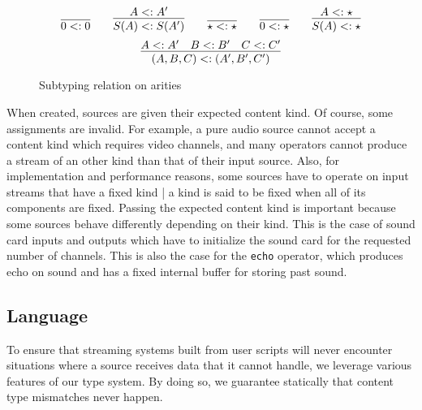 \begin{figure}[htpb]
\[
   \infer{0\sub 0}{} \quad\quad
   \infer{S(A)\sub S(A')}{A\sub A'} \quad\quad
   \infer{\star\sub\star}{} \quad\quad
   \infer{0\sub \star}{} \quad\quad
   \infer{S(A)\sub \star}{A\sub\star}
\]\[
   \infer{(A,B,C) \sub (A',B',C')}{A \sub A' & B\sub B' & C\sub C'}
\]
 \caption{Subtyping relation on arities}
 \label{fig:subtyping}
\end{figure}

When created, sources are given their expected content kind.
Of course, some assignments are invalid.
For example,
a pure audio source cannot accept a content kind which requires video 
channels, and many operators cannot produce a stream of an other kind
than that of their input source.
Also, for implementation and performance reasons, some sources have
to operate on input streams that have a fixed kind |
a kind is said to be fixed when all of its components are fixed.
Passing the expected content kind is important because some sources
behave differently depending on their kind.
This is the case
of sound card inputs and outputs which have to initialize the sound card
for the requested number of channels.
This is also the case for the \texttt{echo} operator,
which produces echo on sound and has a fixed internal buffer for storing past
sound.

\subsection{Language}

To ensure that streaming systems built from user scripts will never
encounter situations where a source receives data that it cannot handle,
we leverage various features of our type system.
By doing so, we guarantee statically that content type mismatches never happen.

